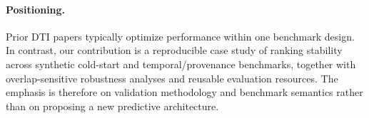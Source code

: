 \paragraph{Positioning.}
Prior DTI papers typically optimize performance within one benchmark design. In contrast, our contribution is a reproducible case study of ranking stability across synthetic cold-start and temporal/provenance benchmarks, together with overlap-sensitive robustness analyses and reusable evaluation resources. The emphasis is therefore on validation methodology and benchmark semantics rather than on proposing a new predictive architecture.
